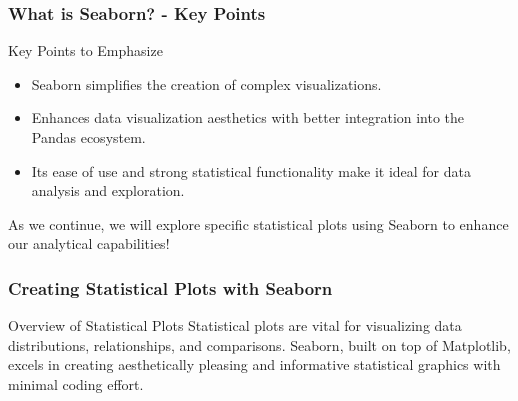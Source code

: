\documentclass[aspectratio=169]{beamer}
\begin{document}
\begin{frame}[fragile]
    \frametitle{What is Seaborn? - Key Points}
    \begin{block}{Key Points to Emphasize}
        \begin{itemize}
            \item Seaborn simplifies the creation of complex visualizations.
            \item Enhances data visualization aesthetics with better integration into the Pandas ecosystem.
            \item Its ease of use and strong statistical functionality make it ideal for data analysis and exploration.
        \end{itemize}
        \end{block}
        As we continue, we will explore specific statistical plots using Seaborn to enhance our analytical capabilities!
\end{frame}

\begin{frame}[fragile]
    \frametitle{Creating Statistical Plots with Seaborn}
    \begin{block}{Overview of Statistical Plots}
        Statistical plots are vital for visualizing data distributions, relationships, and comparisons. 
        Seaborn, built on top of Matplotlib, excels in creating aesthetically pleasing and informative statistical graphics with minimal coding effort.
    \end{block}
\end{frame}
\end{document}
